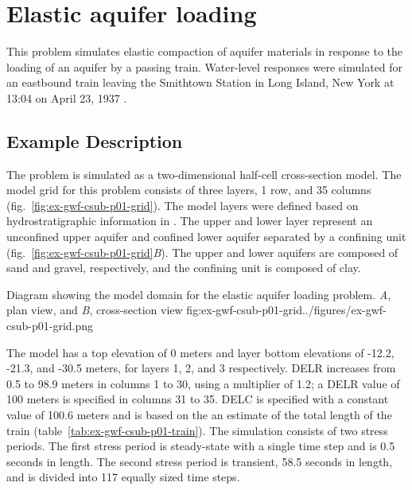 \section{Elastic aquifer loading}
This problem simulates elastic compaction of aquifer materials in response to the loading of an aquifer by a passing train. Water-level responses were simulated for an eastbound train leaving the Smithtown Station in Long Island, New York at 13:04 on April 23, 1937 \citep{jacob1939fluctuations}. 

\subsection{Example Description}

The problem is simulated as a two-dimensional half-cell cross-section model. The model grid for this problem consists of three layers, 1 row, and 35 columns (fig.~\ref{fig:ex-gwf-csub-p01-grid}). The model layers were defined based on hydrostratigraphic information in \cite{jacob1939fluctuations}. The upper and lower layer represent an unconfined upper aquifer and confined lower aquifer separated by a confining unit (fig.~\ref{fig:ex-gwf-csub-p01-grid}\textit{B}). The upper and lower aquifers are composed of sand and gravel, respectively, and the confining unit is composed of clay. 

\begin{StandardFigure}{
                                     Diagram showing the model domain for the elastic aquifer 
                                     loading problem. \textit{A}, plan view, and \textit{B}, cross-section view
                                     }{fig:ex-gwf-csub-p01-grid}{../figures/ex-gwf-csub-p01-grid.png}
\end{StandardFigure}                                 


The model has a top elevation of 0 meters and layer bottom elevations of -12.2, -21.3, and -30.5 meters, for layers 1, 2, and 3 respectively.  DELR increases from 0.5 to 98.9 meters  in columns 1 to 30, using a multiplier of 1.2; a DELR value of 100 meters is specified in columns 31 to 35. DELC is specified with a constant value of 100.6 meters and is based on the an estimate of the total length of the train (table~\ref{tab:ex-gwf-csub-p01-train}). The simulation consists of two stress periods. The first stress period is steady-state with a single time step and is 0.5 seconds in length. The second stress period is transient, 58.5 seconds in length, and is divided into 117 equally sized time steps. 

